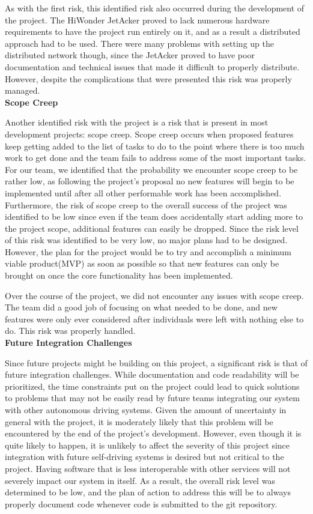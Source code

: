 \documentclass[titlepage, draft]{article}
\begin{document}
As with the first risk, this identified risk also occurred during the development of the project. The HiWonder JetAcker proved to lack numerous hardware requirements to have the project run entirely on it, and as a result a distributed approach had to be used. There were many problems with setting up the distributed network though, since the JetAcker proved to have poor documentation and technical issues that made it difficult to properly distribute. However, despite the complications that were presented this risk was properly managed.
\\

\textbf{Scope Creep}

Another identified risk with the project is a risk that is present in most development projects: scope creep. Scope creep occurs when proposed features keep getting added to the list of tasks to do to the point where there is too much work to get done and the team fails to address some of the most important tasks. For our team, we identified that the probability we encounter scope creep to be rather low, as following the project's proposal no new features will begin to be implemented until after all other performable work has been accomplished. Furthermore, the risk of scope creep to the overall success of the project was identified to be low since even if the team does accidentally start adding more to the project scope, additional features can easily be dropped. Since the risk level of this risk was identified to be very low, no major plans had to be designed. However, the plan for the project would be to try and accomplish a minimum viable product(MVP) as soon as possible so that new features can only be brought on once the core functionality has been implemented.

Over the course of the project, we did not encounter any issues with scope creep. The team did a good job of focusing on what needed to be done, and new features were only ever considered after individuals were left with nothing else to do. This risk was properly handled.
\\

\textbf{Future Integration Challenges}

Since future projects might be building on this project, a significant risk is that of future integration challenges. While documentation and code readability will be prioritized, the time constraints put on the project could lead to quick solutions to problems that may not be easily read by future teams integrating our system with other autonomous driving systems. Given the amount of uncertainty in general with the project, it is moderately likely that this problem will be encountered by the end of the project's development. However, even though it is quite likely to happen, it is unlikely to affect the severity of this project since integration with future self-driving systems is desired but not critical to the project. Having software that is less interoperable with other services will not severely impact our system in itself. As a result, the overall risk level was determined to be low, and the plan of action to address this will be to always properly document code whenever code is submitted to the git repository.
\end{document}
